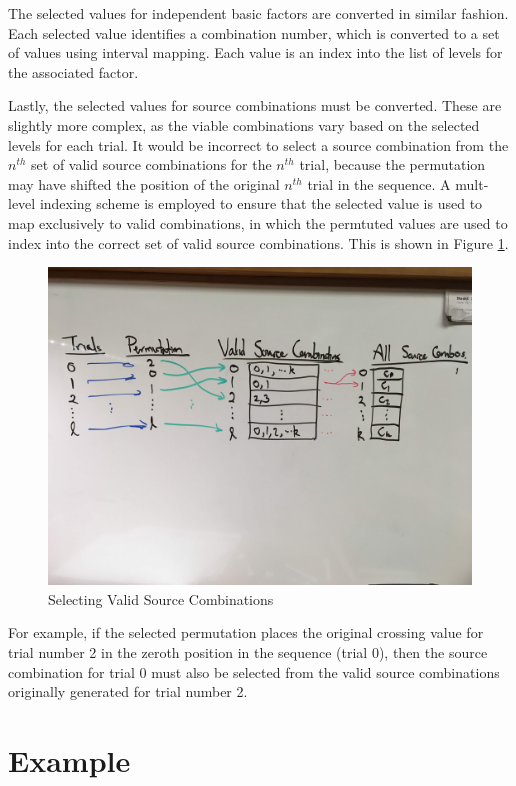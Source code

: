The selected values for independent basic factors are converted in similar fashion. Each selected value identifies a combination number, which is converted to a set of values using interval mapping. Each value is an index into the list of levels for the associated factor.

Lastly, the selected values for source combinations must be converted. These are slightly more complex, as the viable combinations vary based on the selected levels for each trial. It would be incorrect to select a source combination from the $n^{th}$ set of valid source combinations for the $n^{th}$ trial, because the permutation may have shifted the position of the original $n^{th}$ trial in the sequence. A mult-level indexing scheme is employed to ensure that the selected value is used to map exclusively to valid combinations, in which the permtuted values are used to index into the correct set of valid source combinations. This is shown in Figure \ref{fig:source_combinations}.

\begin{figure}
\centering
\centerline{\includegraphics[origin=c,width=12cm]{../figures/source-combinations.jpg}}
\caption{Selecting Valid Source Combinations}
\label{fig:source_combinations}
\end{figure}

For example, if the selected permutation places the original crossing value for trial number 2 in the zeroth position in the sequence (trial 0), then the source combination for trial 0 must also be selected from the valid source combinations originally generated for trial number 2.


\section{Example}

